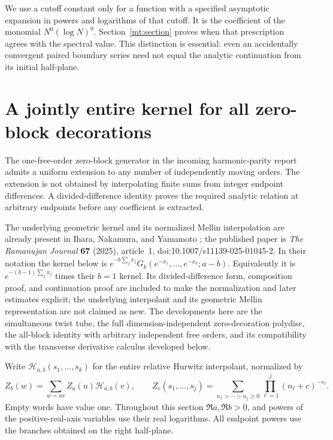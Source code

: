 \documentclass[11pt,letterpaper]{article}
\numberwithin{equation}{section}
\theoremstyle{plain}
\theoremstyle{definition}
\theoremstyle{remark}
\begin{document}
We use a cutoff constant only for a function with a specified asymptotic
expansion in powers and logarithms of that cutoff. It is the coefficient
of the monomial $N^0(\log N)^0$. Section~\ref{mt:section} proves when
that prescription agrees with the spectral value. This distinction
is essential: even an accidentally convergent paired boundary series
need not equal the analytic continuation from its initial half-plane.



\section{A jointly entire kernel for all zero-block decorations}
\label{zbg:section}

The one-free-order zero-block generator in the incoming harmonic-parity
report admits a uniform extension to any number of independently moving
orders.  The extension is not obtained by interpolating finite sums from
integer endpoint differences.  A divided-difference identity proves the
required analytic relation at arbitrary endpoints before any coefficient
is extracted.

The underlying geometric kernel and its normalized Mellin interpolation
are already present in Ihara, Nakamura, and Yamamoto
\cite[Proposition~3.3 and Theorem~4.1]{INY}; the published paper is
\emph{The Ramanujan Journal} \textbf{67} (2025), article~1,
doi:10.1007/s11139-025-01045-2.  In their notation the kernel below is
$e^{-b\sum_jx_j}G_k(e^{-x_1},\ldots,e^{-x_k};a-b)$.
Equivalently it is $e^{-(b-1)\sum_jx_j}$ times their $b=1$ kernel.
Its divided-difference form, composition proof, and continuation proof
are included to make the normalization and later estimates explicit;
the underlying interpolant and its geometric Mellin representation are
not claimed as new.  The developments here are the simultaneous twist
tube, the full dimension-independent zero-decoration polydisc, the
all-block identity with arbitrary independent free orders, and its
compatibility with the transverse derivative calculus developed below.

Write $\mathcal H_{a,b}(s_1,\ldots,s_k)$ for the entire relative
Hurwitz interpolant, normalized by
\[
 Z_b(w)=\sum_{w=uv} Z_a(u)\mathcal H_{a,b}(v),\qquad
 Z_c(s_1,\ldots,s_j)=\sum_{n_1>\cdots>n_j\geq0}
                         \prod_{\ell=1}^j(n_\ell+c)^{-s_\ell}.
\]
Empty words have value one.  Throughout this section
$\Re a,\Re b>0$, and powers of the positive-real-axis variables use
their real logarithms.  All endpoint powers use the branches obtained
on the right half-plane.
\end{document}
